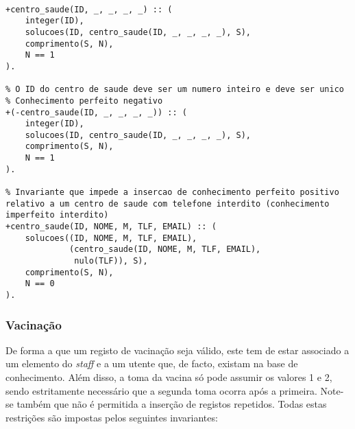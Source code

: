 \

\begin{lstlisting}[caption={Invariante de inserção relativo ao predicado \texttt{centro\_saude}}]
% O ID do centro de saude deve ser um numero inteiro e deve ser unico
+centro_saude(ID, _, _, _, _) :: (
    integer(ID),
    solucoes(ID, centro_saude(ID, _, _, _, _), S),
    comprimento(S, N),
    N == 1
).

% O ID do centro de saude deve ser um numero inteiro e deve ser unico
% Conhecimento perfeito negativo
+(-centro_saude(ID, _, _, _, _)) :: (
    integer(ID),
    solucoes(ID, centro_saude(ID, _, _, _, _), S),
    comprimento(S, N),
    N == 1
).

% Invariante que impede a insercao de conhecimento perfeito positivo relativo a um centro de saude com telefone interdito (conhecimento imperfeito interdito)
+centro_saude(ID, NOME, M, TLF, EMAIL) :: (
    solucoes((ID, NOME, M, TLF, EMAIL),
             (centro_saude(ID, NOME, M, TLF, EMAIL),
              nulo(TLF)), S),
    comprimento(S, N),
    N == 0
).
\end{lstlisting}

\subsubsection*{Vacinação}
De forma a que um registo de vacinação seja válido, este tem de estar associado a um elemento do \textit{staff} e a um
utente que, de facto, existam na base de conhecimento. Além disso, a toma da vacina só pode assumir os valores 1 e 2,
sendo estritamente necessário que a segunda toma ocorra após a primeira. Note-se também que não é permitida a inserção de
registos repetidos. Todas estas restrições são impostas pelos seguintes invariantes:

\

